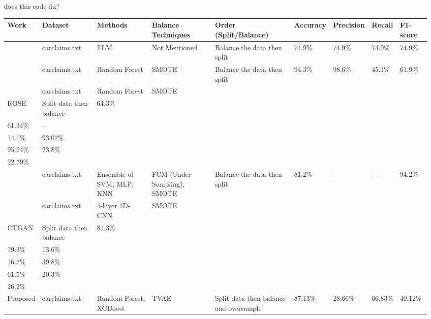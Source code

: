 \documentclass[twoside,11pt]{article}
\begin{document}
does this code fix?
\begin{longtable}{|p{1.8cm}|p{1.2cm}|p{2.2cm}|p{2.3cm}|p{2.5cm}|p{2.2cm}|p{2cm}|p{2.2cm}|p{2.6cm}|}
\hline
\textbf{Work} & \textbf{Dataset} & \textbf{Methods} & \textbf{Balance Techniques} & \textbf{Order (Split/Balance)} & \textbf{Accuracy} & \textbf{Precision} & \textbf{Recall} & \textbf{F1-score} \\
\hline
\cite{Patel2019} & carclaims.txt & ELM & Not Mentioned & Balance the data then split & 74.9\% & 74.9\% & 74.9\% & 74.9\% \\
\hline
\cite{Harjai2019} & carclaims.txt & Random Forest & SMOTE & Balance the data then split & 94.3\% & 98.6\% & 45.1\% & 61.9\% \\
\hline
\cite{Salmi2022} & carclaims.txt & Random Forest & SMOTE \\ ROSE & Split data then balance & 64.3\% \\ 61.34\% & -- \\ 14.1\% & 93.07\% \\ 95.24\% & 23.8\% \\ 22.79\% \\
\hline
\cite{Padhi2020} & carclaims.txt & Ensemble of SVM, MLP, KNN & FCM (Under Sampling), SMOTE & Balance the data then split & 81.2\% & -- & -- & 94.2\% \\
\hline
\cite{Wongpanti2024} & carclaims.txt & 4-layer 1D-CNN & SMOTE \\ CTGAN & Split data then balance & 81.3\% \\ 79.3\% & 13.6\% \\ 16.7\% & 39.8\% \\ 61.5\% & 20.3\% \\ 26.2\% \\
\hline
Proposed & carclaims.txt & Random Forest, XGBoost & TVAE & Split data then balance and oversample & 87.13\% & 28.66\% & 66.83\% & 40.12\% \\
\hline
\end{longtable}



\end{document}
